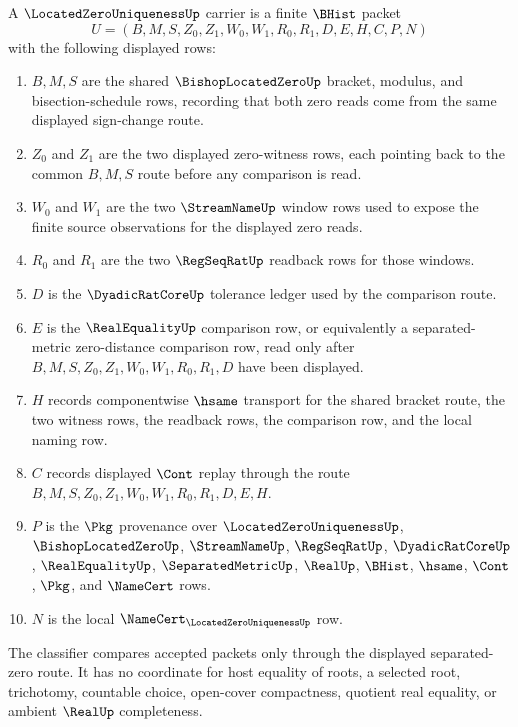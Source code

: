 \begin{definition}
\label{def:located-zero-uniqueness-carrier}
A $\LocatedZeroUniquenessUp$ carrier is a finite $\BHist$ packet
$$
U=(B,M,S,Z_0,Z_1,W_0,W_1,R_0,R_1,D,E,H,C,P,N)
$$
with the following displayed rows:
\begin{enumerate}
\item $B,M,S$ are the shared $\BishopLocatedZeroUp$ bracket, modulus, and bisection-schedule rows, recording that both zero reads come from the same displayed sign-change route.
\item $Z_0$ and $Z_1$ are the two displayed zero-witness rows, each pointing back to the common $B,M,S$ route before any comparison is read.
\item $W_0$ and $W_1$ are the two $\StreamNameUp$ window rows used to expose the finite source observations for the displayed zero reads.
\item $R_0$ and $R_1$ are the two $\RegSeqRatUp$ readback rows for those windows.
\item $D$ is the $\DyadicRatCoreUp$ tolerance ledger used by the comparison route.
\item $E$ is the $\RealEqualityUp$ comparison row, or equivalently a separated-metric zero-distance comparison row, read only after $B,M,S,Z_0,Z_1,W_0,W_1,R_0,R_1,D$ have been displayed.
\item $H$ records componentwise $\hsame$ transport for the shared bracket route, the two witness rows, the readback rows, the comparison row, and the local naming row.
\item $C$ records displayed $\Cont$ replay through the route $B,M,S,Z_0,Z_1,W_0,W_1,R_0,R_1,D,E,H$.
\item $P$ is the $\Pkg$ provenance over $\LocatedZeroUniquenessUp$, $\BishopLocatedZeroUp$, $\StreamNameUp$, $\RegSeqRatUp$, $\DyadicRatCoreUp$, $\RealEqualityUp$, $\SeparatedMetricUp$, $\RealUp$, $\BHist$, $\hsame$, $\Cont$, $\Pkg$, and $\NameCert$ rows.
\item $N$ is the local $\NameCert_{\LocatedZeroUniquenessUp}$ row.
\end{enumerate}
The classifier compares accepted packets only through the displayed separated-zero route. It has no coordinate for host equality of roots, a selected root, trichotomy, countable choice, open-cover compactness, quotient real equality, or ambient $\RealUp$ completeness.
\end{definition}

